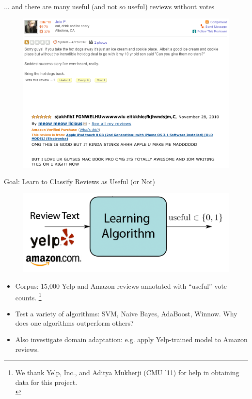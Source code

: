 \documentclass{beamer}
\begin{document}
\begin{frame}{... and there are many useful (and not so useful) reviews without votes}
\begin{figure}[h]
  \centering
  \includegraphics[scale=.4]{review_unvoted}
  \label{fig:dist}
\end{figure}
\end{frame}

\begin{frame}{Goal: Learn to Classify Reviews as Useful (or Not)}
\begin{figure}[h]
  \centering
  \includegraphics[scale=.4]{learning_summary}
  \label{fig:dist}
\end{figure}
\begin{itemize}
\item Corpus: 15,000 Yelp and Amazon reviews annotated with ``useful'' vote counts. \footnote{{\tiny We thank Yelp, Inc., and Aditya Mukherji (CMU '11) for help in obtaining data for this project.}\\}
\item Test a variety of algorithms: SVM, Naive Bayes, AdaBoost, Winnow.  Why does one algorithms outperform others?
\item Also investigate domain adaptation: e.g. apply Yelp-trained model to Amazon reviews.
\end{itemize}
\end{frame}
\end{document}
